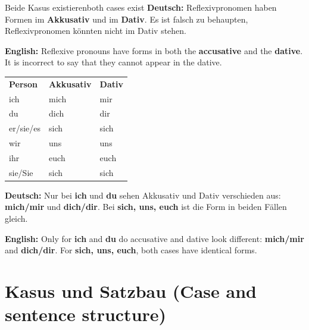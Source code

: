 \documentclass[a4paper,11pt]{article}
\newcommand{\GermanText}[1]{\textbf{Deutsch: }#1\par}
\newcommand{\EnglishText}[1]{{\small\color{SoftGray}\textbf{English: }#1\par}}
\newcommand{\HeaderCell}[1]{\cellcolor{HeaderBlueDark}\color{white}\bfseries #1}
\begin{document}
    \begin{grammarentry}{Beide Kasus existieren}{both cases exist}
        \GermanText{Reflexivpronomen haben Formen im \textbf{Akkusativ} und im \textbf{Dativ}. Es ist falsch zu behaupten, Reflexivpronomen könnten nicht im Dativ stehen.}
        \EnglishText{Reflexive pronouns have forms in both the \textbf{accusative} and the \textbf{dative}. It is incorrect to say that they cannot appear in the dative.}
        \begin{longtable}{>{\raggedright\arraybackslash}p{}>{\raggedright\arraybackslash}p{}>{\raggedright\arraybackslash}p{}}
            \HeaderCell{Person} & \HeaderCell{Akkusativ} & \HeaderCell{Dativ} \\
            ich & mich & mir \\
            du & dich & dir \\
            er/sie/es & sich & sich \\
            wir & uns & uns \\
            ihr & euch & euch \\
            sie/Sie & sich & sich \\
        \end{longtable}
        \GermanText{Nur bei \textbf{ich} und \textbf{du} sehen Akkusativ und Dativ verschieden aus: \textbf{mich/mir} und \textbf{dich/dir}. Bei \textbf{sich, uns, euch} ist die Form in beiden Fällen gleich.}
        \EnglishText{Only for \textbf{ich} and \textbf{du} do accusative and dative look different: \textbf{mich/mir} and \textbf{dich/dir}. For \textbf{sich, uns, euch}, both cases have identical forms.}
    \end{grammarentry}

\section{Kasus und Satzbau (Case and sentence structure)}
\end{document}
